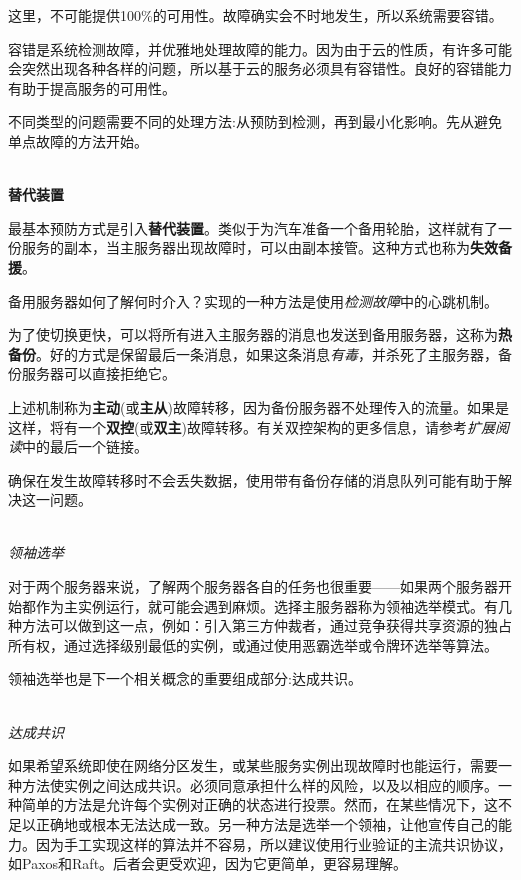 这里，不可能提供100\%的可用性。故障确实会不时地发生，所以系统需要容错。


容错是系统检测故障，并优雅地处理故障的能力。因为由于云的性质，有许多可能会突然出现各种各样的问题，所以基于云的服务必须具有容错性。良好的容错能力有助于提高服务的可用性。

不同类型的问题需要不同的处理方法:从预防到检测，再到最小化影响。先从避免单点故障的方法开始。

\hspace*{\fill} \\ %
\noindent
\textbf{替代装置}

最基本预防方式是引入\textbf{替代装置}。类似于为汽车准备一个备用轮胎，这样就有了一份服务的副本，当主服务器出现故障时，可以由副本接管。这种方式也称为\textbf{失效备援}。

备用服务器如何了解何时介入？实现的一种方法是使用\textit{检测故障}中的心跳机制。

为了使切换更快，可以将所有进入主服务器的消息也发送到备用服务器，这称为\textbf{热备份}。好的方式是保留最后一条消息，如果这条消息\textit{有毒}，并杀死了主服务器，备份服务器可以直接拒绝它。

上述机制称为\textbf{主动}(或\textbf{主从})故障转移，因为备份服务器不处理传入的流量。如果是这样，将有一个\textbf{双控}(或\textbf{双主})故障转移。有关双控架构的更多信息，请参考\textit{扩展阅读}中的最后一个链接。

确保在发生故障转移时不会丢失数据，使用带有备份存储的消息队列可能有助于解决这一问题。

\hspace*{\fill} \\ %
\noindent
\textit{领袖选举}

对于两个服务器来说，了解两个服务器各自的任务也很重要——如果两个服务器开始都作为主实例运行，就可能会遇到麻烦。选择主服务器称为领袖选举模式。有几种方法可以做到这一点，例如：引入第三方仲裁者，通过竞争获得共享资源的独占所有权，通过选择级别最低的实例，或通过使用恶霸选举或令牌环选举等算法。

领袖选举也是下一个相关概念的重要组成部分:达成共识。

\hspace*{\fill} \\ %
\noindent
\textit{达成共识}

如果希望系统即使在网络分区发生，或某些服务实例出现故障时也能运行，需要一种方法使实例之间达成共识。必须同意承担什么样的风险，以及以相应的顺序。一种简单的方法是允许每个实例对正确的状态进行投票。然而，在某些情况下，这不足以正确地或根本无法达成一致。另一种方法是选举一个领袖，让他宣传自己的能力。因为手工实现这样的算法并不容易，所以建议使用行业验证的主流共识协议，如Paxos和Raft。后者会更受欢迎，因为它更简单，更容易理解。

